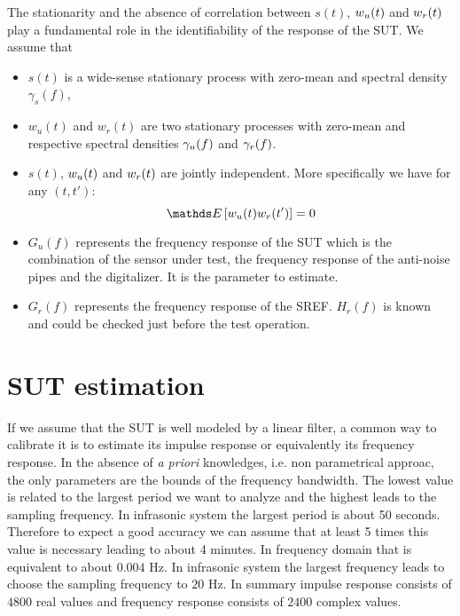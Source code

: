 The stationarity and the absence of correlation between $s(t)$, $w_{{u}}(t)$ and $w_{{r}}(t)$ play a fundamental  role in the identifiability of the response of the SUT. We assume that
\begin{itemize}
\item
$s(t)$ is a wide-sense stationary process with zero-mean and spectral density $\gamma_{s}(f)$,
\item
$w_{u}(t)$ and $w_{r}(t)$ are two  stationary processes with zero-mean and respective spectral densities $\gamma_{{u}}(f)$ and $\gamma_{{r}}(f)$. 
\item
$s(t)$,  $w_{{u}}(t)$ and $w_{{r}}(t)$ are jointly independent. More specifically we have for any $(t,t')$:
$$
 \esp{w_{\ut}(t)w_{r}(t')}=0
$$
\item
$G_{u}(f)$ represents the frequency response of the SUT which is the combination of the sensor under test, the frequency response of the anti-noise pipes and the digitalizer. It is the parameter to estimate.
\item
$G_{r}(f)$ represents the frequency response of the SREF. $H_{r}(f)$ is known and could be checked just before the test operation.
\end{itemize}



\section{SUT estimation}
If we assume that the SUT is well modeled by a linear filter, a common way to calibrate it is to estimate its impulse response or equivalently its frequency response. In the absence of {\it a priori} knowledges, i.e. non parametrical approac, the only parameters are the bounds of the frequency bandwidth. The lowest value is related to the largest period we want to analyze and the highest leads to the sampling frequency. In infrasonic system the largest period is about 50 seconds. Therefore to expect a good accuracy we can assume that at least 5 times this value is necessary leading to about 4 minutes. In frequency domain that is equivalent to about $0.004$ Hz. In infrasonic system the largest frequency leads to choose the sampling frequency to $20$ Hz. In summary impulse response consists of $4800$ real values and frequency response consists of $2400$ complex values. 


